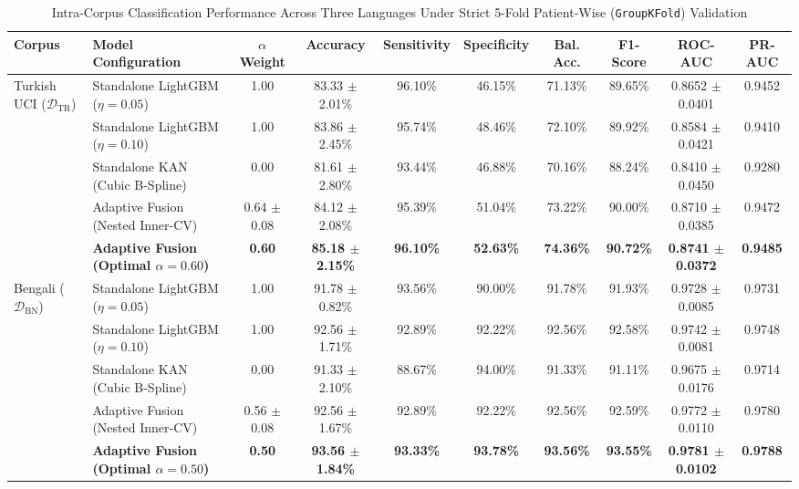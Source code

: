 \documentclass[journal,10pt,twoside]{IEEEtran}
\begin{document}
\begin{table}[t]
\caption{Intra-Corpus Classification Performance Across Three Languages Under Strict 5-Fold Patient-Wise (\texttt{GroupKFold}) Validation}
\label{tab:intracorpus}
\centering
\scriptsize
\begin{tabular}{llcccccccc}
\toprule
\textbf{Corpus} & \textbf{Model Configuration} & \textbf{$\alpha$ Weight} & \textbf{Accuracy} & \textbf{Sensitivity} & \textbf{Specificity} & \textbf{Bal. Acc.} & \textbf{F1-Score} & \textbf{ROC-AUC} & \textbf{PR-AUC} \\
\midrule
\multirow{5}{*}{Turkish UCI ($\mathcal{D}_{\text{TR}}$)} 
& Standalone LightGBM ($\eta = 0.05$) & 1.00 & 83.33 $\pm$ 2.01\% & 96.10\% & 46.15\% & 71.13\% & 89.65\% & 0.8652 $\pm$ 0.0401 & 0.9452 \\
& Standalone LightGBM ($\eta = 0.10$) & 1.00 & 83.86 $\pm$ 2.45\% & 95.74\% & 48.46\% & 72.10\% & 89.92\% & 0.8584 $\pm$ 0.0421 & 0.9410 \\
& Standalone KAN (Cubic B-Spline) & 0.00 & 81.61 $\pm$ 2.80\% & 93.44\% & 46.88\% & 70.16\% & 88.24\% & 0.8410 $\pm$ 0.0450 & 0.9280 \\
& Adaptive Fusion (Nested Inner-CV) & 0.64 $\pm$ 0.08 & 84.12 $\pm$ 2.08\% & 95.39\% & 51.04\% & 73.22\% & 90.00\% & 0.8710 $\pm$ 0.0385 & 0.9472 \\
& \textbf{Adaptive Fusion (Optimal $\alpha=0.60$)} & \textbf{0.60} & \textbf{85.18 $\pm$ 2.15\%} & \textbf{96.10\%} & \textbf{52.63\%} & \textbf{74.36\%} & \textbf{90.72\%} & \textbf{0.8741 $\pm$ 0.0372} & \textbf{0.9485} \\
\midrule
\multirow{5}{*}{Bengali ($\mathcal{D}_{\text{BN}}$)} 
& Standalone LightGBM ($\eta = 0.05$) & 1.00 & 91.78 $\pm$ 0.82\% & 93.56\% & 90.00\% & 91.78\% & 91.93\% & 0.9728 $\pm$ 0.0085 & 0.9731 \\
& Standalone LightGBM ($\eta = 0.10$) & 1.00 & 92.56 $\pm$ 1.71\% & 92.89\% & 92.22\% & 92.56\% & 92.58\% & 0.9742 $\pm$ 0.0081 & 0.9748 \\
& Standalone KAN (Cubic B-Spline) & 0.00 & 91.33 $\pm$ 2.10\% & 88.67\% & 94.00\% & 91.33\% & 91.11\% & 0.9675 $\pm$ 0.0176 & 0.9714 \\
& Adaptive Fusion (Nested Inner-CV) & 0.56 $\pm$ 0.08 & 92.56 $\pm$ 1.67\% & 92.89\% & 92.22\% & 92.56\% & 92.59\% & 0.9772 $\pm$ 0.0110 & 0.9780 \\
& \textbf{Adaptive Fusion (Optimal $\alpha=0.50$)} & \textbf{0.50} & \textbf{93.56 $\pm$ 1.84\%} & \textbf{93.33\%} & \textbf{93.78\%} & \textbf{93.56\%} & \textbf{93.55\%} & \textbf{0.9781 $\pm$ 0.0102} & \textbf{0.9788} \\

\end{tabular}
\end{table}
\end{document}
